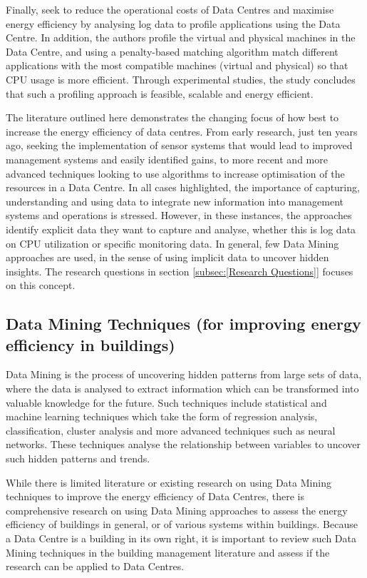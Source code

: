 \documentclass[12pt]{scrartcl}
\begin{document}
Finally, \citet{VASUDEVAN201794} seek to reduce the operational costs of Data Centres and maximise energy efficiency by analysing log data to profile applications using the Data Centre. In addition, the authors profile the virtual and physical machines in the Data Centre, and using a penalty-based matching algorithm match different applications with the most compatible machines (virtual and physical) so that CPU usage is more efficient. Through experimental studies, the study concludes that such a profiling approach is feasible, scalable and energy efficient.

The literature outlined here demonstrates the changing focus of how best to increase the energy efficiency of data centres. From early research, just ten years ago, seeking the implementation of sensor systems that would lead to improved management systems and easily identified gains, to more recent and more advanced techniques looking to use algorithms to increase optimisation of the resources in a Data Centre. In all cases highlighted, the importance of capturing, understanding and using data to integrate new information into management systems and operations is stressed. However, in these instances, the approaches identify explicit data they want to capture and analyse, whether this is log data on CPU utilization or specific monitoring data. In general, few Data Mining approaches are used, in the sense of using implicit data to uncover hidden insights. The research questions in section \ref{subsec:[Research Questions]} focuses on this concept.  


\subsection{Data Mining Techniques (for improving energy efficiency in buildings)}  
\label{subsec:[Data Mining Techniques]}
Data Mining is the process of uncovering hidden patterns from large sets of data, where the data is analysed to extract information which can be transformed into valuable knowledge for the future. Such techniques include statistical and machine learning techniques which take the form of regression analysis, classification, cluster analysis and more advanced techniques such as neural networks. These techniques analyse the relationship between variables to uncover such hidden patterns and trends.  

While there is limited literature or existing research on using Data Mining techniques to improve the energy efficiency of Data Centres, there is comprehensive research on using Data Mining approaches to assess the energy efficiency of buildings in general, or of various systems within buildings. Because a Data Centre is a building in its own right, it is important to review such Data Mining techniques in the building management literature and assess if the research can be applied to Data Centres.   
\end{document}
